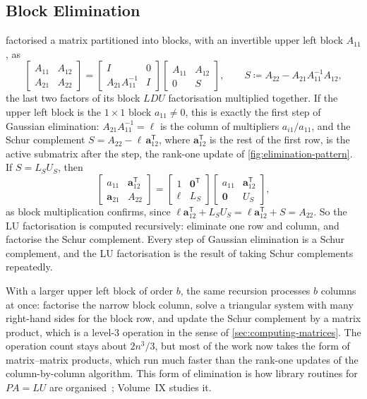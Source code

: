 \subsection{Block Elimination}

 factorised a matrix partitioned into blocks, with an invertible upper left block $A_{11}$, as
\[
\begin{bmatrix}A_{11}&A_{12}\\A_{21}&A_{22}\end{bmatrix}=\begin{bmatrix}I&0\\A_{21}A_{11}^{-1}&I\end{bmatrix}\begin{bmatrix}A_{11}&A_{12}\\0&S\end{bmatrix},\qquad S\coloneqq A_{22}-A_{21}A_{11}^{-1}A_{12},
\]
the last two factors of its block $LDU$ factorisation multiplied together. If the upper left block is the $1\times1$ block $a_{11}\ne0$, this is exactly the first step of Gaussian elimination: $A_{21}A_{11}^{-1}=\boldsymbol\ell$ is the column of multipliers $a_{i1}/a_{11}$, and the Schur complement $S=A_{22}-\boldsymbol\ell\,\mathbf a_{12}^{\mathsf T}$, where $\mathbf a_{12}^{\mathsf T}$ is the rest of the first row, is the active submatrix after the step, the rank-one update of \cref{fig:elimination-pattern}. If $S=L_SU_S$, then
\[
\begin{bmatrix}a_{11}&\mathbf a_{12}^{\mathsf T}\\\mathbf a_{21}&A_{22}\end{bmatrix}=\begin{bmatrix}1&\mathbf 0^{\mathsf T}\\\boldsymbol\ell&L_S\end{bmatrix}\begin{bmatrix}a_{11}&\mathbf a_{12}^{\mathsf T}\\\mathbf 0&U_S\end{bmatrix},
\]
as block multiplication confirms, since $\boldsymbol\ell\mathbf a_{12}^{\mathsf T}+L_SU_S=\boldsymbol\ell\mathbf a_{12}^{\mathsf T}+S=A_{22}$. So the LU factorisation is computed recursively: eliminate one row and column, and factorise the Schur complement. Every step of Gaussian elimination is a Schur complement, and the LU factorisation is the result of taking Schur complements repeatedly.

With a larger upper left block of order $b$, the same recursion processes $b$ columns at once: factorise the narrow block column, solve a triangular system with many right-hand sides for the block row, and update the Schur complement by a matrix product, which is a level-3 operation in the sense of \cref{sec:computing-matrices}. The operation count stays about $2n^3/3$, but most of the work now takes the form of matrix--matrix products, which run much faster than the rank-one updates of the column-by-column algorithm. This  form of elimination is how library routines for $PA=LU$ are organised~\cite[Sect.~3.2]{golub2013}; Volume~IX studies it.

